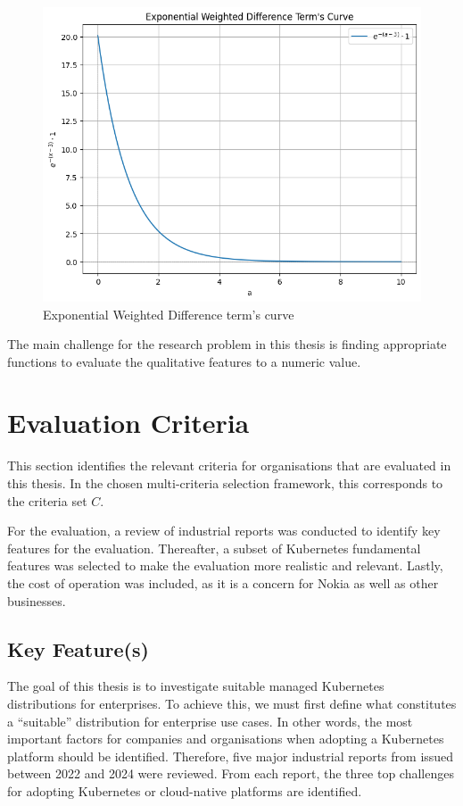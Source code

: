 \begin{figure}
    \centering
    \includegraphics[width=0.75\linewidth]{resources/example exponential function.png}
    \caption{Exponential Weighted Difference term's curve}
    \label{fig:example-exp-func-graph}
\end{figure}

The main challenge for the research problem in this thesis is finding
appropriate functions to evaluate the qualitative features to a numeric
value.

\section{Evaluation Criteria}\label{evaluation-criteria}

This section identifies the relevant criteria for organisations that are evaluated in this thesis. In the chosen multi-criteria selection framework, this corresponds to the criteria set $C$.

For the evaluation, a review of industrial reports was conducted to identify key features for the evaluation. Thereafter, a subset of Kubernetes fundamental features was selected to make the evaluation more realistic and relevant. Lastly, the cost of operation was included, as it is a concern for Nokia as well as other businesses.

\subsection{Key Feature(s)}\label{key-features-for-evaluation}


The goal of this thesis is to investigate suitable managed Kubernetes distributions for enterprises. To achieve this, we must first define what constitutes a “suitable” distribution for enterprise use cases. In other words, the most important factors for companies and organisations when adopting a Kubernetes platform should be identified. Therefore, five major industrial reports from issued between 2022 and 2024 were reviewed. From each report, the three top challenges for adopting Kubernetes or cloud-native platforms are identified.


